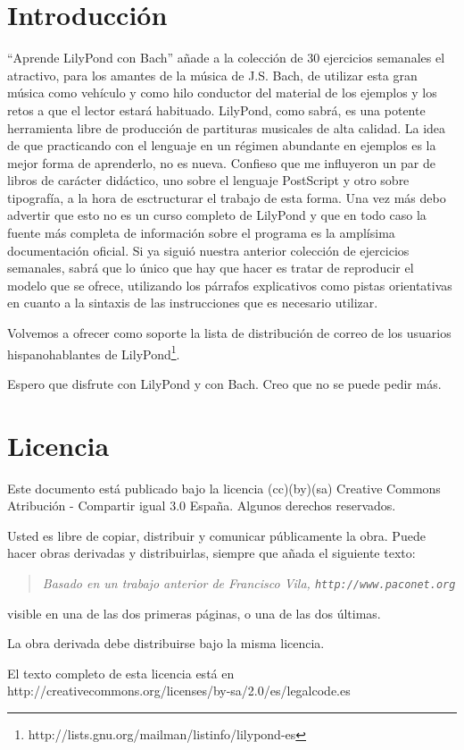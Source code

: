 \section*{Introducción}

``Aprende LilyPond con Bach'' añade a la colección de 30 ejercicios
semanales el atractivo, para los amantes de la música de J.S. Bach, de
utilizar esta gran música como vehículo y como hilo conductor del
material de los ejemplos y los retos a que el lector estará habituado.
LilyPond, como sabrá, es una potente herramienta libre de producción
de partituras musicales de alta calidad.  La idea de que practicando
con el lenguaje en un régimen abundante en ejemplos es la mejor forma
de aprenderlo, no es nueva. Confieso que me influyeron un par de
libros de carácter didáctico, uno sobre el lenguaje PostScript y otro
sobre tipografía, a la hora de esctructurar el trabajo de esta
forma. Una vez más debo advertir que esto no es un curso completo de
LilyPond y que en todo caso la fuente más completa de información
sobre el programa es la amplísima documentación oficial.  Si ya siguió
nuestra anterior colección de ejercicios semanales, sabrá que lo único
que hay que hacer es tratar de reproducir el modelo que se ofrece,
utilizando los párrafos explicativos como pistas orientativas en
cuanto a la sintaxis de las instrucciones que es necesario utilizar.

Volvemos a ofrecer como soporte la lista de distribución de correo de
los usuarios hispanohablantes de
LilyPond\footnote{http://lists.gnu.org/mailman/listinfo/lilypond-es}.

Espero que disfrute con LilyPond y con Bach. Creo que no se puede
pedir más.

\section*{Licencia}

Este documento está publicado bajo la licencia (cc)(by)(sa) Creative
Commons Atribución - Compartir igual 3.0 España.  Algunos derechos
reservados.

Usted es libre de copiar, distribuir y comunicar públicamente la obra.
Puede hacer obras derivadas y distribuirlas, siempre que añada el
siguiente texto:

\begin{quote}
\emph{Basado en un trabajo anterior de Francisco Vila,
  \texttt{http://www.paconet.org} }
\end{quote}

visible en una de las dos primeras páginas, o una de las dos últimas.

La obra derivada debe distribuirse bajo la misma licencia.

El texto completo de esta licencia está en
http://creativecommons.org/licenses/by-sa/2.0/es/legalcode.es



